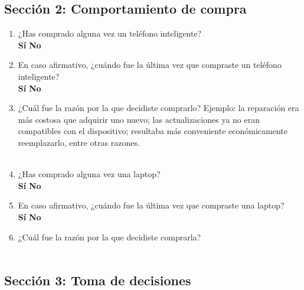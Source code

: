 \subsection*{Sección 2: Comportamiento de compra}

\begin{enumerate}[resume]
    \item ¿Has comprado alguna vez un teléfono inteligente? \\
    \textbf{Sí} \quad \textbf{No}

    \item En caso afirmativo, ¿cuándo fue la última vez que compraste un
    teléfono inteligente? \\
    \textbf{Sí} \quad \textbf{No}

    \item ¿Cuál fue la razón por la que decidiste comprarlo? Ejemplo: la
    reparación era más costosa que adquirir uno nuevo; las actualizaciones ya no
    eran compatibles con el dispositivo; resultaba más conveniente
    económicamente reemplazarlo, entre otras razones. \\
    \underline{\hspace{\linewidth}} \\
    \underline{\hspace{\linewidth}}

    \item ¿Has comprado alguna vez una laptop? \\
    \textbf{Sí} \quad \textbf{No}

    \item En caso afirmativo, ¿cuándo fue la última vez que compraste una
    laptop? \\
    \textbf{Sí} \quad \textbf{No}

    \item ¿Cuál fue la razón por la que decidiste comprarla? \\
    \underline{\hspace{\linewidth}} \\
    \underline{\hspace{\linewidth}}

\end{enumerate}

\subsection*{Sección 3: Toma de decisiones}

